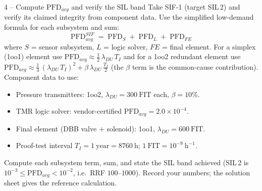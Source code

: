 \documentclass[11pt,a4paper]{article}
\begin{document}
\begin{stepbox}{4 -- Compute $\mathrm{PFD}_{avg}$ and verify the SIL band}
Take SIF-1 (target SIL\,2) and verify its claimed integrity from component
data. Use the simplified low-demand formula for each subsystem and sum:
\[
\mathrm{PFD}_{avg}^{SIF}
   \;=\; \mathrm{PFD}_S \;+\; \mathrm{PFD}_L \;+\; \mathrm{PFD}_{FE}
\]
where $S$ = sensor subsystem, $L$ = logic solver, $FE$ = final element.
For a simplex (1oo1) element use $\mathrm{PFD}_{avg}\approx
\tfrac{1}{2}\,\lambda_{DU}\,T_I$ and for a 1oo2 redundant element use
$\mathrm{PFD}_{avg}\approx \tfrac{1}{3}\,(\lambda_{DU}\,T_I)^2 +
\beta\,\lambda_{DU}\,\tfrac{T_I}{2}$ (the $\beta$ term is the common-cause
contribution). Component data to use:
\begin{itemize}[leftmargin=1.4em]\setlength{\itemsep}{1pt}
  \item Pressure transmitters: 1oo2, $\lambda_{DU}=300\ \mathrm{FIT}$ each,
        $\beta=10\%$.
  \item TMR logic solver: vendor-certified $\mathrm{PFD}_{avg}=
        2.0\times10^{-4}$.
  \item Final element (DBB valve + solenoid): 1oo1,
        $\lambda_{DU}=600\ \mathrm{FIT}$.
  \item Proof-test interval $T_I = 1\ \mathrm{year} = 8760\ \mathrm{h}$;
        $1\ \mathrm{FIT}=10^{-9}\ \mathrm{h}^{-1}$.
\end{itemize}
Compute each subsystem term, sum, and state the SIL band achieved (SIL\,2 is
$10^{-3}\le \mathrm{PFD}_{avg} < 10^{-2}$, i.e.\ RRF $100$--$1000$). Record
your numbers; the solution sheet gives the reference calculation.
\end{stepbox}
\end{document}
